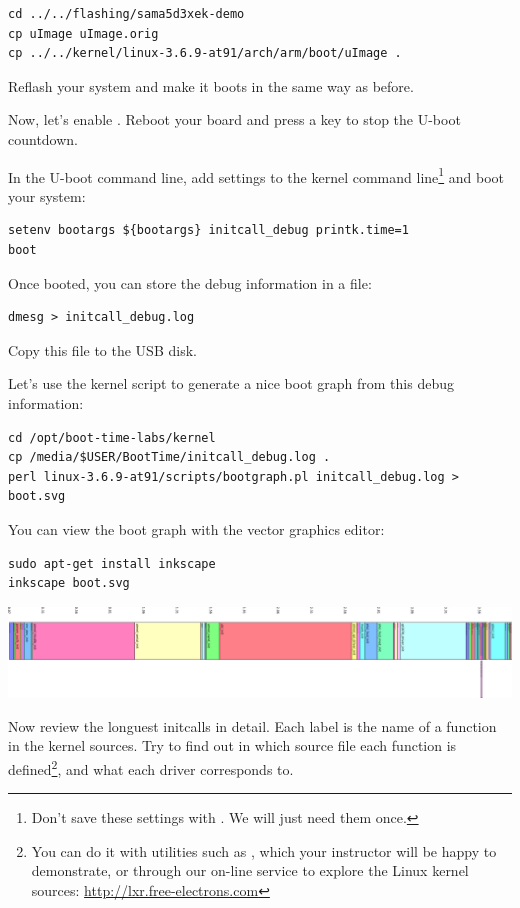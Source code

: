\begin{verbatim}
cd ../../flashing/sama5d3xek-demo
cp uImage uImage.orig
cp ../../kernel/linux-3.6.9-at91/arch/arm/boot/uImage .
\end{verbatim}

Reflash your system and make it boots in the same way as before.

Now, let's enable . Reboot your board and press
a key to stop the U-boot countdown.

In the U-boot command line, add settings to the kernel command
line\footnote{Don't save these settings with . We
will just need them once.}
and boot your system:
\begin{verbatim}
setenv bootargs ${bootargs} initcall_debug printk.time=1
boot
\end{verbatim}

Once booted, you can store the debug information in a file:

\begin{verbatim}
dmesg > initcall_debug.log
\end{verbatim}

Copy this file to the USB disk.

Let's use the kernel script to generate a nice boot graph
from this debug information:

\begin{verbatim}
cd /opt/boot-time-labs/kernel
cp /media/$USER/BootTime/initcall_debug.log .
perl linux-3.6.9-at91/scripts/bootgraph.pl initcall_debug.log > boot.svg
\end{verbatim}

You can view the boot graph with the  vector graphics
editor:

\begin{verbatim}
sudo apt-get install inkscape
inkscape boot.svg
\end{verbatim}

\begin{center}
\includegraphics[width=\textwidth]{labs/boottime-kernel/boot.png}
\end{center}

Now review the longuest initcalls in detail. Each label is the name of
a function in the kernel sources. Try to find out in which source file
each function is defined\footnote{You can do it with utilities such as
, which your instructor will be happy to demonstrate,
or through our on-line service to explore the Linux kernel sources:
\url{http://lxr.free-electrons.com}}, and what each driver corresponds
to.

